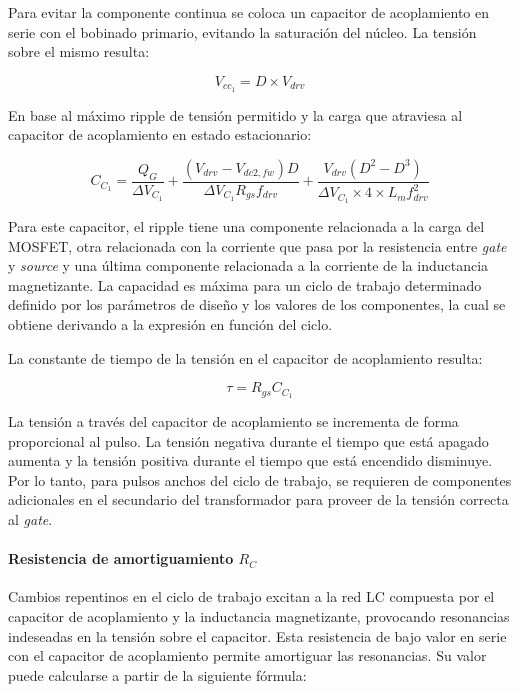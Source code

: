 Para evitar la componente continua se coloca un capacitor de acoplamiento en serie con el bobinado primario, 
evitando la saturación del núcleo. La tensión sobre el mismo resulta: 

$$ V_{cc_1}=D\times V_{drv} $$

En base al máximo ripple de tensión permitido y la carga que atraviesa al capacitor de acoplamiento en estado estacionario:

$$ C_{C_1}=\frac{Q_G}{\Delta V_{C_1}}+\frac{(V_{drv}-V_{dc2,fw})D}{\Delta V_{C_1}R_{gs}f_{drv}}+\frac{V_{drv}(D^2-D^3)}{\Delta V_{C_1}\times4\times L_mf_{drv}^2} $$

Para este capacitor, el ripple tiene una componente relacionada a la carga del MOSFET, 
otra relacionada con la corriente que pasa por la resistencia entre \textit{gate} y \textit{source} 
y una última componente relacionada a la corriente de la inductancia magnetizante. 
La capacidad es máxima para un ciclo de trabajo determinado definido por los parámetros de diseño 
y los valores de los componentes, la cual se obtiene derivando a la expresión en función del ciclo. 

La constante de tiempo de la tensión en el capacitor de acoplamiento resulta:

$$ \tau=R_{gs}C_{C_1} $$

La tensión a través del capacitor de acoplamiento se incrementa de forma proporcional al pulso. 
La tensión negativa durante el tiempo que está apagado aumenta y la tensión positiva durante el tiempo que está encendido disminuye. 
Por lo tanto, para pulsos anchos del ciclo de trabajo, se requieren de componentes adicionales 
en el secundario del transformador para proveer de la tensión correcta al \textit{gate}. 


\paragraph{Resistencia de amortiguamiento $R_C$}

Cambios repentinos en el ciclo de trabajo excitan a la red LC compuesta por el capacitor de acoplamiento 
y la inductancia magnetizante, provocando resonancias indeseadas en la tensión sobre el capacitor. 
Esta resistencia de bajo valor en serie con el capacitor de acoplamiento permite amortiguar las resonancias. 
Su valor puede calcularse a partir de la siguiente fórmula:

